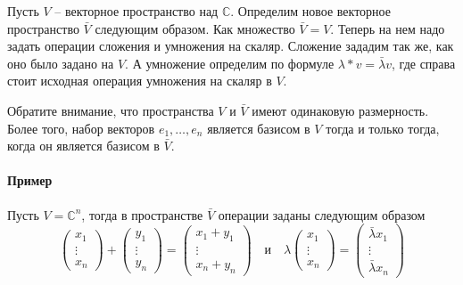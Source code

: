 \begin{definition}
Пусть $V$ -- векторное пространство над $\mathbb C$. Определим новое векторное пространство $\bar V$ следующим образом. Как множество $\bar V = V$. Теперь на нем надо задать операции сложения и умножения на скаляр. Сложение зададим так же, как оно было задано на $V$. А умножение определим по формуле $\lambda *v = \bar \lambda v$, где справа стоит исходная операция умножения на скаляр в $V$.
\end{definition}

Обратите внимание, что пространства $V$ и $\bar V$ имеют одинаковую размерность. Более того, набор векторов $e_1,\ldots,e_n$ является базисом в $V$ тогда и только тогда, когда он является базисом в $\bar V$.

\paragraph{Пример}
Пусть $V = \mathbb C^n$, тогда в пространстве $\bar V$ операции заданы следующим образом
\[
\begin{pmatrix}
{x_1}\\{\vdots}\\{x_n}
\end{pmatrix}
+
\begin{pmatrix}
{y_1}\\{\vdots}\\{y_n}
\end{pmatrix}
=
\begin{pmatrix}
{x_1 + y_1}\\{\vdots}\\{x_n + y_n}
\end{pmatrix}
\quad\text{и}\quad
\lambda
\begin{pmatrix}
{x_1}\\{\vdots}\\{x_n}
\end{pmatrix}
=
\begin{pmatrix}
{\bar \lambda x_1}\\{\vdots}\\{\bar \lambda x_n}
\end{pmatrix}
\]

